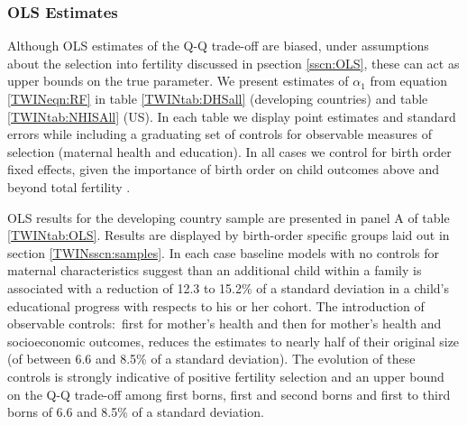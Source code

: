 \documentclass[subeqn]{article}
\begin{document}
\begin{spacing}{1.4}
\subsubsection{OLS Estimates} \label{TWINsscn:QQtwinsOLS}
Although OLS estimates of the Q-Q trade-off are biased, under assumptions about
the selection into fertility discussed in psection \ref{sscn:OLS}, these can
act as upper bounds on the true parameter.  We present estimates of $\alpha_1$
from equation \ref{TWINeqn:RF} in table \ref{TWINtab:DHSall} (developing
countries) and table \ref{TWINtab:NHISAll} (US). In each table we display point
estimates and standard errors while including a graduating set of controls for
observable measures of selection (maternal health and education). In all cases
we control for birth order fixed effects, given the importance of birth order
on child outcomes above and beyond total fertility \citep{Blacketal2005}.

OLS results for the developing country sample are presented in panel A of table
\ref{TWINtab:OLS}.  Results are displayed by birth-order specific groups
laid out in section \ref{TWINsscn:samples}.  In each case baseline models with
no controls for maternal characteristics suggest than an additional child
within a family is associated with a reduction of 12.3 to 15.2\% of a standard
deviation in a child's educational progress with respects to his or her cohort.
The introduction of observable controls:\ first for mother's health and then for
mother's health and socioeconomic outcomes, reduces the estimates to nearly half
of their original size (of between 6.6 and 8.5\% of a standard deviation). The
evolution of these controls is strongly indicative of positive fertility
selection and an upper bound on the Q-Q trade-off among first borns, first and
second borns and first to third borns of 6.6 and 8.5\% of a standard deviation.


\end{spacing}
\end{document}
